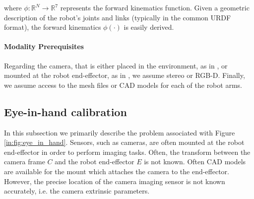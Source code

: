 where $\phi: \mathbb{R}^N\rightarrow\mathbb{R}^{7}$ represents the forward kinematics function.
Given a geometric description of the robot's joints and links (typically in the common URDF format), the forward kinematics $\phi(\cdot)$ is easily derived.

\paragraph{Modality Prerequisites} Regarding the camera, that is either placed in the environment, as in , or mounted at the robot end-effector, as in , we assume stereo or RGB-D. Finally, we assume access to the mesh files or CAD models for each of the robot arms.




\subsection{Eye-in-hand calibration}

In this subsection we primarily describe the problem associated with Figure \ref{in:fig:eye_in_hand}.
Sensors, such as cameras, are often mounted at the robot end-effector in order to perform imaging tasks.
Often, the transform between the camera frame $C$ and the robot end-effector $E$ is not known.
Often CAD models are available for the mount which attaches the camera to the end-effector.
However, the precise location of the camera imaging sensor is not known accurately, i.e. the camera extrinsic parameters.

